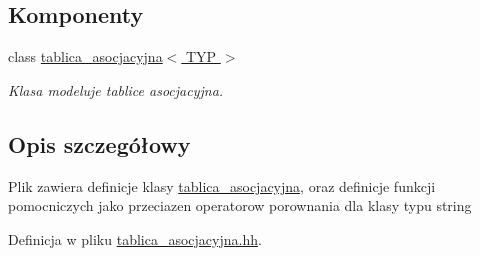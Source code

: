 \subsection*{\-Komponenty}
\begin{DoxyCompactItemize}
\item 
class \hyperlink{classtablica__asocjacyjna}{tablica\-\_\-asocjacyjna$<$ T\-Y\-P $>$}
\begin{DoxyCompactList}\small\item\em \-Klasa modeluje tablice asocjacyjna. \end{DoxyCompactList}\end{DoxyCompactItemize}


\subsection{\-Opis szczegółowy}
\-Plik zawiera definicje klasy \hyperlink{classtablica__asocjacyjna}{tablica\-\_\-asocjacyjna}, oraz definicje funkcji pomocniczych jako przeciazen operatorow porownania dla klasy typu string 

\-Definicja w pliku \hyperlink{tablica__asocjacyjna_8hh_source}{tablica\-\_\-asocjacyjna.\-hh}.

